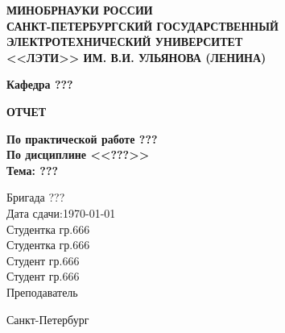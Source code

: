 \documentclass[../main]{subfiles}
\begin{document}
\begin{titlepage}
    \begin{large}
        \centering
        
        \MakeUppercase{\bfseries
            минобрнауки россии\\
            санкт-петербургский государственный\\
            электротехнический университет\\
            <<лэти>> им. в.и. ульянова (ленина)
        }
        
        {\bfseries
            Кафедра ???
        }
        
        \vfill
        
        \MakeUppercase{\bfseries
            отчет
        }

        {\bfseries
            По практической работе ???\\
            По дисциплине <<???>>\\
            Тема: ???
        }

        \vfill
        
        {\normalsize
            Бригада ???\\Дата сдачи:\today\\
            \vfill
            Студентка гр.666\hfill\underline{\hspace{5cm}}\\
            Студентка гр.666\hfill\underline{\hspace{5cm}}\\
            Студент гр.666\hfill\underline{\hspace{5cm}}\\
            Студент гр.666\hfill\underline{\hspace{5cm}}\\
            Преподаватель\hfill \underline{\hspace{5cm}}\makebox[0.5cm]{}\\
        }

        \vspace{1cm}

        {\normalsize
            Санкт-Петербург\\
            \the\year
        }
        
    \end{large}
\end{titlepage}

\setcounter{page}{2}
\end{document}
